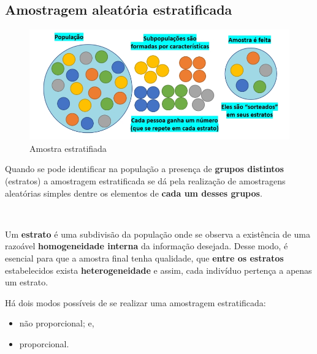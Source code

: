 \documentclass[
]{book}
\providecommand{\tightlist}{%
  \setlength{\itemsep}{0pt}\setlength{\parskip}{0pt}}
\begin{document}
\hfill\break

\hypertarget{amostragem-aleatuxf3ria-estratificada}{%
\subsection{Amostragem aleatória estratificada}\label{amostragem-aleatuxf3ria-estratificada}}

\hfill\break

\begin{figure}

{\centering \includegraphics[width=0.8\linewidth]{images7/estratificada2} 

}

\caption{Amostra estratifiada}\label{fig:fig05}
\end{figure}

\hfill\break

Quando se pode identificar na população a presença de \textbf{grupos distintos} (estratos) a amostragem estratificada se dá pela realização de amostragens aleatórias simples dentre os elementos de \textbf{cada um desses grupos}.

~

Um \textbf{estrato} é uma subdivisão da população onde se observa a existência de uma razoável \textbf{homogeneidade interna} da informação desejada. Desse modo, é esencial para que a amostra final tenha qualidade, que \textbf{entre os estratos} estabelecidos exista \textbf{heterogeneidade} e assim, cada indivíduo pertença a apenas um estrato.

\hfill\break

Há dois modos possíveis de se realizar uma amostragem estratificada:

\hfill\break

\begin{itemize}
\tightlist
\item
  não proporcional; e,
\item
  proporcional.
\end{itemize}

\hfill\break
\end{document}
